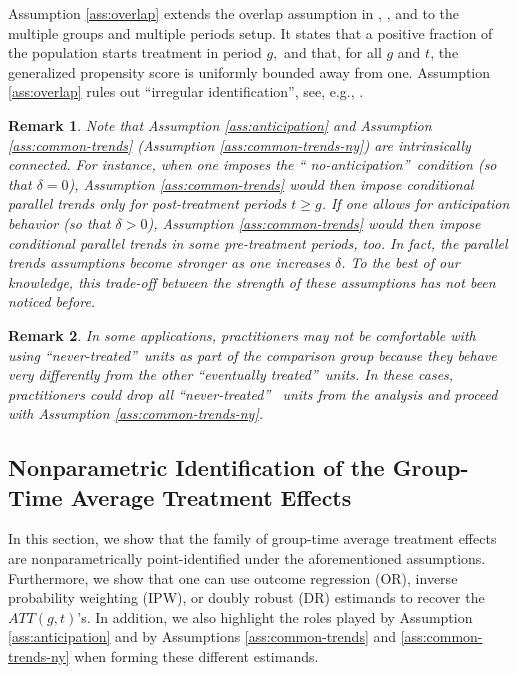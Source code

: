 \documentclass[11pt]{article}%
\theoremstyle{plain}
\newtheorem{remark}{Remark}
\numberwithin{sassumption}{section}
\numberwithin{equation}{section}
\begin{document}
Assumption \ref{ass:overlap} extends the overlap assumption in
\cite{Heckman1997, Heckman1998}, \cite{Abadie2005}, and \cite{SantAnna2020} to
the multiple groups and multiple periods setup. It states that a positive
fraction of the population starts treatment in period $g,$ and that, for all
$g$ and $t$, the generalized propensity score is uniformly bounded away from
one. Assumption \ref{ass:overlap} rules out \textquotedblleft irregular
identification\textquotedblright, see, e.g., \cite{Khan2010}.

\begin{remark}
\label{Rem:anticip}Note that Assumption \ref{ass:anticipation} and Assumption
\ref{ass:common-trends} (Assumption \ref{ass:common-trends-ny}) are
intrinsically connected. For instance, when one imposes the \textquotedblleft
no-anticipation\textquotedblright\ condition (so that $\delta=0$), Assumption
\ref{ass:common-trends} would then impose conditional parallel trends only for
post-treatment periods $t\geq g$. If one allows for anticipation behavior (so
that $\delta>0$), Assumption \ref{ass:common-trends} would then impose
conditional parallel trends in some pre-treatment periods, too. In fact, the
parallel trends assumptions become stronger as one increases $\delta$. To the
best of our knowledge, this trade-off between the strength of these
assumptions has not been noticed before.
\end{remark}

\begin{remark}
In some applications, practitioners may not be comfortable with using
\textquotedblleft never-treated\textquotedblright\ units as part of the
comparison group because they behave very differently from the other
\textquotedblleft eventually treated\textquotedblright\ units. In these cases,
practitioners could drop all \textquotedblleft never-treated\textquotedblright%
\ units from the analysis and proceed with Assumption
\ref{ass:common-trends-ny}.
\end{remark}

\subsection{Nonparametric Identification of the Group-Time Average Treatment
Effects}

In this section, we show that the family of group-time average treatment
effects are nonparametrically point-identified under the aforementioned
assumptions. Furthermore, we show that one can use outcome regression (OR),
inverse probability weighting (IPW), or doubly robust (DR) estimands to
recover the $ATT\left(  g,t\right)  $'s. In addition, we also highlight the
roles played by Assumption \ref{ass:anticipation} and by Assumptions
\ref{ass:common-trends} and \ref{ass:common-trends-ny} when forming these
different estimands.
\end{document}

